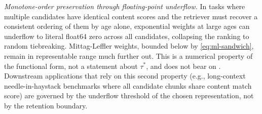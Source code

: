 \documentclass[11pt]{article}
\theoremstyle{plain}
\theoremstyle{definition}
\begin{document}
\emph{Monotone-order preservation through
floating-point underflow.}  In tasks where multiple
candidates have identical content scores and the
retriever must recover a consistent ordering of them
by age alone, exponential weights at large ages can
underflow to literal float64 zero across all
candidates, collapsing the ranking to random
tiebreaking.  Mittag-Leffler weights, bounded below
by \eqref{eq:ml-sandwich}, remain in representable
range much further out.  This is a numerical
property of the functional form, not a statement
about $\tau^*$, and does not bear on
.  Downstream applications that
rely on this second property (e.g., long-context
needle-in-haystack benchmarks where all candidate
chunks share content match score) are governed by
the underflow threshold of the chosen representation,
not by the retention boundary.
\end{document}
